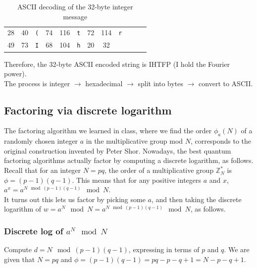 {{\begin{table}[h!]
\begin{tabular}{|c c c|c c c|c c c|c c c|}
28 & 40 & \texttt{(} &
74 & 116 & \texttt{t} &
72 & 114 & \texttt{r} &
 &  &  \\

49 & 73 & \texttt{I} &
68 & 104 & \texttt{h} &
20 & 32 & \textvisiblespace &
 &  &  \\
\hline
\end{tabular}
\caption{ASCII decoding of the 32-byte integer message}
\end{table}

Therefore, the 32-byte ASCII encoded string is IHTFP (I hold the Fourier power). \\

The process is integer $\rightarrow$ hexadecimal $\rightarrow$ split into bytes $\rightarrow$ convert to ASCII.
}%
} 

\newpage
\subsection{Factoring via discrete logarithm}
The factoring algorithm we learned in class, where we find the order $\phi_a(N)$ of a randomly chosen integer $a$ in the multiplicative group mod $N$, corresponds to the original construction invented by Peter Shor. Nowadays, the best quantum factoring algorithms actually factor by computing a discrete logarithm, as follows. \\

Recall that for an integer $N=pq$, the order of a multiplicative group $\mathbb{Z}^*_N$ is $\phi = (p-1)(q-1)$. This means that for any positive integers $a$ and $x$, $a^x = a^{N \mod (p-1)(q-1)} \mod N$. \\

It turns out this lets us factor by picking some $a$, and then taking the discrete logarithm of $w = a^N \mod N = a^{N \mod (p-1)(q-1)} \mod N$, as follows.

\subsubsection{Discrete log of $a^N \mod N$}
Compute $d = N\mod (p-1)(q-1)$, expressing in terms of $p$ and $q$. We are given that $N=pq$ and $\phi = (p-1)(q-1) = pq - p-q+1= N - p-q+1$. 

\noindent{} 


